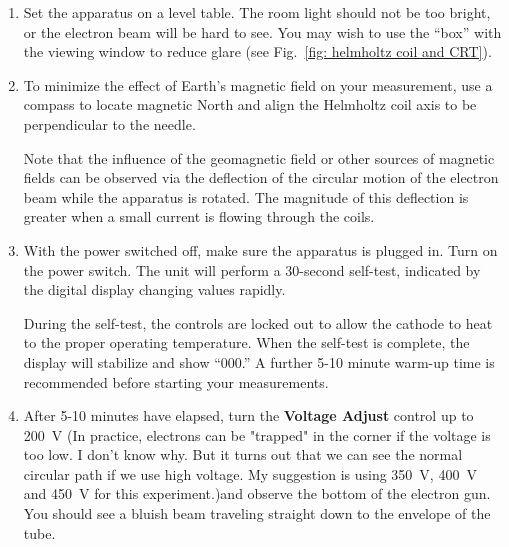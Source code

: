 \documentclass[addpoints]{physlabs}
\begin{document}
\begin{labsection}
\begin{experiment}
    \begin{center}
    \setlength{\fboxsep}{6pt}%
    \setlength{\fboxrule}{2pt}%
    \end{center}

    \begin{enumerate}
        \item  Set the apparatus on a level table. The room light should not be too bright, or the electron beam will be hard to see. You may wish to use the ``box'' with the viewing window to reduce glare (see Fig.~\ref{fig: helmholtz coil and CRT}).
        
        \item To minimize the effect of Earth's magnetic field on your measurement, use a compass to locate magnetic North and align the Helmholtz coil axis to be perpendicular to the needle.
        
        Note that the influence of the geomagnetic field or other sources of magnetic fields can be observed via the deflection of the circular motion of the electron beam while the apparatus is rotated. The magnitude of this deflection is greater when a small current is flowing through the coils.
        
        \item With the power switched off, make sure the apparatus is plugged in. Turn on the power switch. The unit will perform a 30-second self-test, indicated by the digital display changing values rapidly. 
        
        During the self-test, the controls are locked out to allow the cathode to heat to the proper operating temperature. When the self-test is complete, the display will stabilize and show ``000.'' A further 5-10 minute warm-up time is recommended before starting your measurements.

        \item After 5-10 minutes have elapsed, turn the \textbf{Voltage Adjust} control up to \qty{200}{\volt} {\color{red} (In practice, electrons can be "trapped" in the corner if the voltage is too low. I don't know why. But it turns out that we can see the normal circular path if we use high voltage. My suggestion is using \qty{350}{\volt}, \qty{400}{\volt} and \qty{450}{\volt} for this experiment.)}and observe the bottom of the electron gun. You should see a bluish beam traveling straight down to the envelope of the tube.
        

\end{enumerate}
\end{experiment}
\end{labsection}
\end{document}

